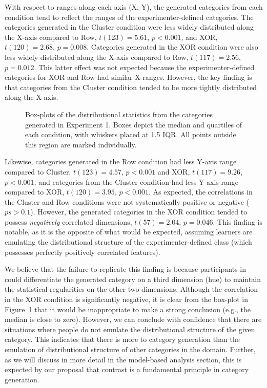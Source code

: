 \documentclass[12pt]{article}
\newcommand\inputpgf[2]{{
\let\pgfimageWithoutPath\pgfimage
\renewcommand{\pgfimage}[2][]{\pgfimageWithoutPath[##1]{#1/##2}}

}}
\begin{document}
\begin{flushleft}
With respect to ranges along each axis (X, Y), the generated categories from
each condition tend to reflect the ranges of the experimenter-defined
categories. The categories generated in the Cluster condition were less widely
distributed along the X-axis compared to Row, $t(123) = 5.61$, $p < 0.001$, and
XOR, $t(120) = 2.68$, $p = 0.008$. Categories generated in the XOR condition
were also less widely distributed along the X-axis compared to Row, $t(117) =
2.56$, $p = 0.012$. This latter effect was not expected because the
experimenter-defined categories for XOR and Row had similar X-ranges. However,
the key finding is that categories from the Cluster condition tended to be more
tightly distributed along the X-axis.

\begin{figure}
    \begin{center} \inputpgf{figs/}{e1-statsboxes.pgf}
    \caption{Box-plots of the distributional statistics from the categories
generated in Experiment 1. Boxes depict the median and quartiles of each
condition, with whiskers placed at 1.5 IQR. All points outside this region are
marked individually.}
    \label{fig:e1-statsboxes}
    \end{center}
\end{figure}


Likewise, categories generated in the Row condition had less Y-axis range
compared to Cluster, $t(123) = 4.57$, $p < 0.001$ and XOR, $t(117) = 9.26$, $p <
0.001$, and categories from the Cluster condition had less Y-axis range compared
to XOR, $t(120) = 3.95$, $p < 0.001$. As expected, the correlations in the
Cluster and Row conditions were not systematically positive or negative ($ps >
0.1$). However, the generated categories in the XOR condition tended to possess
{\em negatively} correlated dimensions, $t(57) = 2.04$, $p = 0.046$. This
finding is notable, as it is the opposite of what would be expected, assuming
learners are emulating the distributional structure of the experimenter-defined
class (which possesses perfectly positively correlated features).

We believe that the failure to replicate this finding is because participants in
\cite{jern2013probabilistic} could differentiate the generated category on a
third dimension (hue) to maintain the statistical regularities on the other two
dimensions. Although the correlation in the XOR condition is significantly
negative, it is clear from the box-plot in Figure~\ref{fig:e1-statsboxes} that
it would be inappropriate to make a strong conclusion (e.g., the median is close
to zero). However, we can conclude with confidence that there are situations
where people do not emulate the distributional structure of the given category.
This indicates that there is more to category generation than the emulation of
distributional structure of other categories in the domain. Further, as we will
discuss in more detail in the model-based analysis section, this is expected by
our proposal that contrast is a fundamental principle in category generation.



\end{flushleft}
\end{document}

